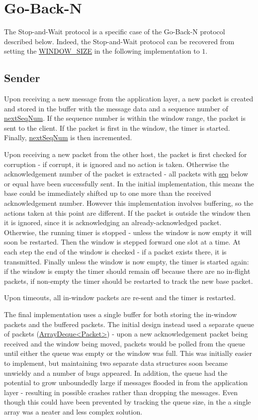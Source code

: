 \documentclass[a4paper]{article}
\newcommand{\code}{\url}
\begin{document}
\section{Go-Back-N}

The Stop-and-Wait protocol is a specific case of the Go-Back-N protocol described below. Indeed, the Stop-and-Wait protocol can be recovered from setting the \code{WINDOW_SIZE} in the following implementation to $1$.

\subsection{Sender}

Upon receiving a new message from the application layer, a new packet is created and stored in the buffer with the message data and a sequence number of \code{nextSeqNum}. If the sequence number is within the window range, the packet is sent to the client. If the packet is first in the window, the timer is started. Finally, \code{nextSeqNum} is then incremented.

Upon receiving a new packet from the other host, the packet is first checked for corruption - if corrupt, it is ignored and no action is taken. Otherwise the acknowledgement number of the packet is extracted - all packets with \code{seq} below or equal have been successfully sent. In the initial implementation, this means the base could be immediately shifted up to one more than the received acknowledgement number. However this implementation involves buffering, so the actions taken at this point are different. If the packet is outside the window then it is ignored, since it is acknowledging an already-acknowledged packet. Otherwise, the running timer is stopped - unless the window is now empty it will soon be restarted. Then the window is stepped forward one slot at a time. At each step the end of the window is checked - if a packet exists there, it is transmitted. Finally unless the window is now empty, the timer is started again: if the window is empty the timer should remain off because there are no in-flight packets, if non-empty the timer should be restarted to track the new base packet.

Upon timeouts, all in-window packets are re-sent and the timer is restarted.

The final implementation uses a single buffer for both storing the in-window packets and the buffered packets. The initial design instead used a separate queue of packets (\code{ArrayDeque<Packet>}) - upon a new acknowledgement packet being received and the window being moved, packets would be polled from the queue until either the queue was empty or the window was full. This was initially easier to implement, but maintaining two separate data structures soon became unwieldy and a number of bugs appeared. In addition, the queue had the potential to grow unboundedly large if messages flooded in from the application layer - resulting in possible crashes rather than dropping the messages. Even though this could have been prevented by tracking the queue size, in the a single array was a neater and less complex solution.
\end{document}
